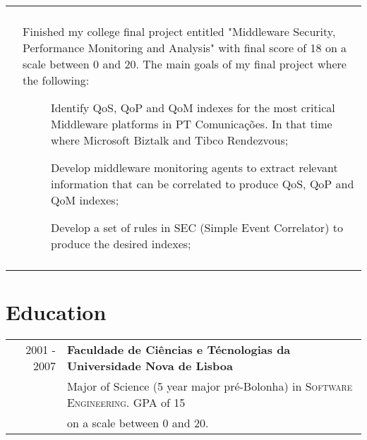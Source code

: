 \documentclass[a4paper,10pt]{article}
\begin{document}
\begin{tabular}{rp{11cm}}
\begin{compactitem}
   \end{compactitem}\vspace{-1em} \\
  & \begin{compactitem}
   \item Finished my college final project entitled "Middleware Security, Performance Monitoring and Analysis" with final score of 18 on a scale between 0 and 20.
   The main goals of my final project where the following: 
   \begin{description}
		\item[] Identify QoS, QoP and QoM indexes for the most critical Middleware platforms in PT Comunicações. In that time where Microsoft Biztalk and Tibco Rendezvous;
   \end{description}
   \begin{description}
		\item[] Develop middleware monitoring agents to extract relevant information that can be correlated to produce QoS, QoP and QoM indexes;
   \end{description}
      \begin{description}
		\item[] Develop a set of rules in SEC (Simple Event Correlator) to produce the desired indexes;
   \end{description}
   \end{compactitem}\vspace{-1em} \\
\multicolumn{2}{c}{} \\

\end{tabular}

\section{Education}
\begin{tabular}{rl}	
2001 - 2007 & \textbf{Faculdade de Ciências e Técnologias da Universidade Nova de Lisboa}\\
 & Major of Science (5 year major pré-Bolonha) in \textsc{Software Engineering}. GPA of 15\\
 & on a scale between 0 and 20. \\
\end{tabular}
\end{document}
